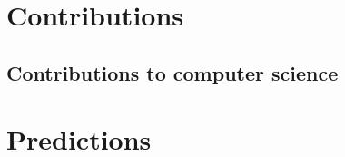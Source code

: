 \section{Contributions}








\subsection{Contributions to computer science}



\section{Predictions}


